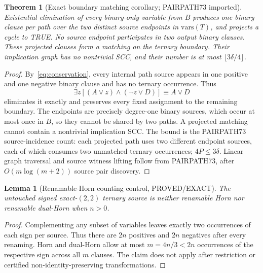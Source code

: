 \documentclass[11pt]{article}
\newtheorem{theorem}{Theorem}
\newtheorem{lemma}{Lemma}
\begin{document}
\begin{theorem}[Exact boundary matching corollary; PAIRPATH73 imported]
Existential elimination of every binary-only variable from $B$ produces one binary clause per path over the two distinct source endpoints in $\mathrm{vars}(T)$, and projects a cycle to TRUE. No source endpoint participates in two output binary clauses. These projected clauses form a matching on the ternary boundary. Their implication graph has no nontrivial SCC, and their number is at most $\lfloor 3\delta/4\rfloor$.
\end{theorem}
\begin{proof}
By~\eqref{eq:conservation}, every internal path source appears in one positive and one negative binary clause and has no ternary occurrence. Thus
\[
\exists z[(A\lor z)\land(\neg z\lor D)]\equiv A\lor D
\]
eliminates it exactly and preserves every fixed assignment to the remaining boundary. The endpoints are precisely degree-one binary sources, which occur at most once in $B$, so they cannot be shared by two paths. A projected matching cannot contain a nontrivial implication SCC. The bound is the PAIRPATH73 source-incidence count: each projected path uses two different endpoint sources, each of which consumes two unmatched ternary occurrences; $4P\le3\delta$. Linear graph traversal and source witness lifting follow from PAIRPATH73, after $O(m\log(m+2))$ source pair discovery.
\end{proof}

\begin{lemma}[Renamable-Horn counting control, PROVED/EXACT]
The untouched signed exact-$(2,2)$ ternary source is neither renamable Horn nor renamable dual-Horn when $n>0$.
\end{lemma}
\begin{proof}
Complementing any subset of variables leaves exactly two occurrences of each sign per source. Thus there are $2n$ positives and $2n$ negatives after every renaming. Horn and dual-Horn allow at most $m=4n/3<2n$ occurrences of the respective sign across all $m$ clauses. The claim does not apply after restriction or certified non-identity-preserving transformations.
\end{proof}
\end{document}
